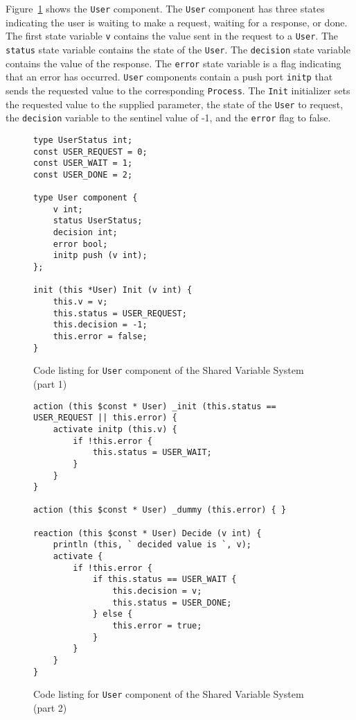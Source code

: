 Figure~\ref{user1} shows the \verb+User+ component.
The \verb+User+ component has three states indicating the user is waiting to make a request, waiting for a response, or done.
The first state variable \verb+v+ contains the value sent in the request to a \verb+User+.
The \verb+status+ state variable contains the state of the \verb+User+.
The \verb+decision+ state variable contains the value of the response.
The \verb+error+ state variable is a flag indicating that an error has occurred.
\verb+User+ components contain a push port \verb+initp+ that sends the requested value to the corresponding \verb+Process+.
The \verb+Init+ initializer sets the requested value to the supplied parameter, the state of the \verb+User+ to request, the \verb+decision+ variable to the sentinel value of -1, and the \verb+error+ flag to false.

\begin{figure}
\begin{verbatim}
type UserStatus int;
const USER_REQUEST = 0;
const USER_WAIT = 1;
const USER_DONE = 2;

type User component {
    v int;
    status UserStatus;
    decision int;
    error bool;
    initp push (v int);
};

init (this *User) Init (v int) {
    this.v = v;
    this.status = USER_REQUEST;
    this.decision = -1;
    this.error = false;
}
\end{verbatim}
\cprotect\caption{Code listing for \verb+User+ component of the Shared Variable System (part 1)}
\label{user1}
\end{figure}

\begin{figure}
\begin{verbatim}
action (this $const * User) _init (this.status == USER_REQUEST || this.error) {
    activate initp (this.v) {
        if !this.error {
            this.status = USER_WAIT;
        }
    }
}

action (this $const * User) _dummy (this.error) { }

reaction (this $const * User) Decide (v int) {
    println (this, ` decided value is `, v);
    activate {
        if !this.error {
            if this.status == USER_WAIT {
                this.decision = v;
                this.status = USER_DONE;
            } else {
                this.error = true;
            }
        }
    }
}
\end{verbatim}
\cprotect\caption{Code listing for \verb+User+ component of the Shared Variable System (part 2)}
\label{user2}
\end{figure}


